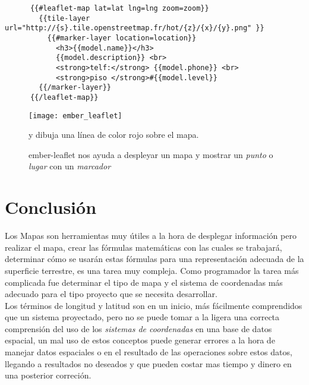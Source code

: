     \begin{verbatim}
      {{#leaflet-map lat=lat lng=lng zoom=zoom}}
        {{tile-layer url="http://{s}.tile.openstreetmap.fr/hot/{z}/{x}/{y}.png" }}
          {{#marker-layer location=location}}
            <h3>{{model.name}}</h3>
            {{model.description}} <br>
            <strong>telf:</strong> {{model.phone}} <br>
            <strong>piso </strong>#{{model.level}}
        {{/marker-layer}}
      {{/leaflet-map}}
    \end{verbatim}

    \begin{figure}[H]
    \label{fig:ember_leaflet}
          \begin{center}
            \texttt{[image: ember\_leaflet]}
          \end{center}
          \caption[Open Street Maps]{ember-leaflet nos ayuda a despleyar un mapa y mostrar un \emph{punto} o \emph{lugar} con un \emph{marcador}} y dibuja una línea de color rojo sobre el mapa.
    \end{figure}









  \section{Conclusi\'on} %
  \label{sec:geo_conclusion}
    Los Mapas son herramientas muy útiles a la hora de desplegar información pero realizar el mapa, crear las fórmulas matemáticas con las cuales se trabajará, determinar cómo se usarán estas fórmulas para una representación adecuada de la superficie terrestre, es una tarea muy compleja. Como programador la tarea más complicada fue determinar el tipo de mapa y el sistema de coordenadas más adecuado para el tipo proyecto que se necesita desarrollar.\\

    Los términos de longitud y latitud son en un inicio, más fácilmente comprendidos que un sistema proyectado, pero no se puede tomar a la ligera una correcta comprensión del uso de los \emph{sistemas de coordenadas} en una base de datos espacial, un mal uso de estos conceptos puede generar errores a la hora de manejar datos  espaciales o en el resultado de las operaciones sobre estos  datos, llegando a resultados no deseados y que pueden costar mas tiempo y dinero en una posterior correci\'on.\\

